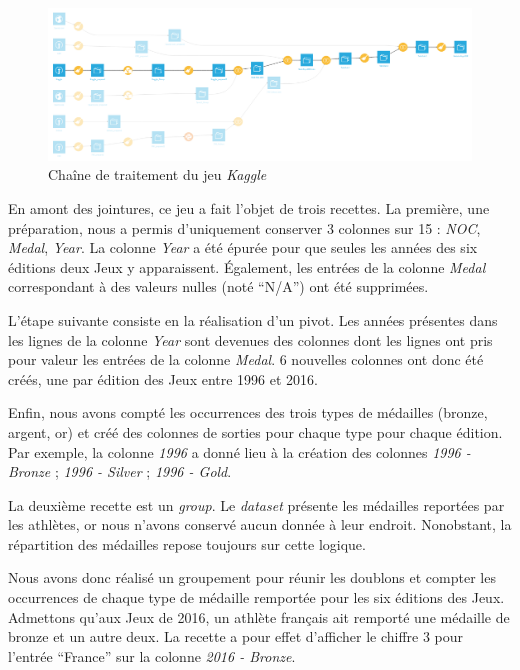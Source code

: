 \documentclass[hidelinks, 12pt]{report}
\begin{document}
\begin{center}
	\begin{figure}[H]
		\setlength{\belowcaptionskip}{-35pt}
		\includegraphics[scale=0.35]{images/flow-medals-kaggle.png}
		\caption{Chaîne de traitement du jeu \textit{Kaggle}}
	\end{figure}
\end{center}

En amont des jointures, ce jeu a fait l'objet de trois recettes. La première, une préparation, nous a permis d'uniquement conserver 3 colonnes sur 15 : \textit{NOC}, \textit{Medal}, \textit{Year}. La colonne \textit{Year} a été épurée pour que seules les années des six éditions deux Jeux y apparaissent. Également, les entrées de la colonne \textit{Medal} correspondant à des valeurs nulles (noté \enquote{N/A}) ont été supprimées.

L'étape suivante consiste en la réalisation d'un pivot. Les années présentes dans les lignes de la colonne \textit{Year} sont devenues des colonnes dont les lignes ont pris pour valeur les entrées de la colonne \textit{Medal}. 6 nouvelles colonnes ont donc été créés, une par édition des Jeux entre 1996 et 2016.

Enfin, nous avons compté les occurrences des trois types de médailles (bronze, argent, or) et créé des colonnes de sorties pour chaque type pour chaque édition. Par exemple, la colonne \emph{1996} a donné lieu à la création des colonnes \emph{1996 - Bronze} ; \emph{1996 - Silver} ; \emph{1996 - Gold}.

La deuxième recette est un \emph{group}. Le \emph{dataset} présente les médailles reportées par les athlètes, or nous n'avons conservé aucun donnée à leur endroit. Nonobstant, la répartition des médailles repose toujours sur cette logique.

Nous avons donc réalisé un groupement pour réunir les doublons et compter les occurrences de chaque type de médaille remportée pour les six éditions des Jeux. Admettons qu'aux Jeux de 2016, un athlète français ait remporté une médaille de bronze et un autre deux. La recette a pour effet d'afficher le chiffre 3 pour l'entrée \enquote{France} sur la colonne \emph{2016 - Bronze}.
\end{document}
